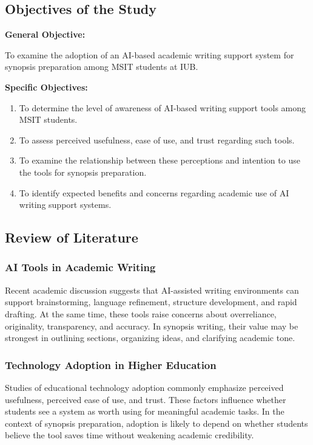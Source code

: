 \documentclass[11pt,a4paper]{article}
\begin{document}
\subsection{Objectives of the Study}

\textbf{General Objective:}

To examine the adoption of an AI-based academic writing support system for synopsis preparation among MSIT students at IUB.

\textbf{Specific Objectives:}

\begin{enumerate}[leftmargin=*]
  \item To determine the level of awareness of AI-based writing support tools among MSIT students.
  \item To assess perceived usefulness, ease of use, and trust regarding such tools.
  \item To examine the relationship between these perceptions and intention to use the tools for synopsis preparation.
  \item To identify expected benefits and concerns regarding academic use of AI writing support systems.
\end{enumerate}

\subsection{Review of Literature}

\subsubsection{AI Tools in Academic Writing}

Recent academic discussion suggests that AI-assisted writing environments can support brainstorming, language refinement, structure development, and rapid drafting. At the same time, these tools raise concerns about overreliance, originality, transparency, and accuracy. In synopsis writing, their value may be strongest in outlining sections, organizing ideas, and clarifying academic tone.

\subsubsection{Technology Adoption in Higher Education}

Studies of educational technology adoption commonly emphasize perceived usefulness, perceived ease of use, and trust. These factors influence whether students see a system as worth using for meaningful academic tasks. In the context of synopsis preparation, adoption is likely to depend on whether students believe the tool saves time without weakening academic credibility.
\end{document}
